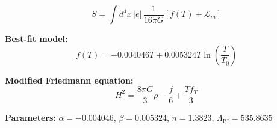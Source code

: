 
\begin{equation}
  S = \int d^4x \, |e| \, \frac{1}{16\pi G} \left[ f(T) + \mathcal{L}_m \right]
\end{equation}

\textbf{Best-fit model:}
\begin{equation}
  f(T) = -0.004046 T + 0.005324 T \ln\!\left(\frac{T}{T_0}\right)
\end{equation}

\textbf{Modified Friedmann equation:}
\begin{equation}
  H^2 = \frac{8\pi G}{3} \rho - \frac{f}{6} + \frac{T f_T}{3}
\end{equation}

\textbf{Parameters:}
$\alpha = -0.004046$, \quad
$\beta = 0.005324$, \quad
$n = 1.3823$, \quad
$\Lambda_{\text{BI}} = 535.8635$